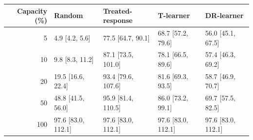 \begin{tabular}{@{}rllll@{}}
\toprule
Capacity (\%) & Random & Treated-response & T-learner & DR-learner \\
\midrule
5 & 4.9 [4.2, 5.6] & 77.5 [64.7, 90.1] & 68.7 [57.2, 79.6] & 56.0 [45.1, 67.5] \\
10 & 9.8 [8.3, 11.2] & 87.1 [73.5, 101.0] & 78.1 [66.5, 89.6] & 57.4 [46.3, 69.2] \\
20 & 19.5 [16.6, 22.4] & 93.4 [79.6, 107.6] & 81.6 [69.3, 93.5] & 58.7 [46.9, 70.7] \\
50 & 48.8 [41.5, 56.0] & 95.9 [81.4, 110.5] & 86.0 [73.2, 99.1] & 69.7 [57.5, 82.5] \\
100 & 97.6 [83.0, 112.1] & 97.6 [83.0, 112.1] & 97.6 [83.0, 112.1] & 97.6 [83.0, 112.1] \\
\bottomrule
\end{tabular}
